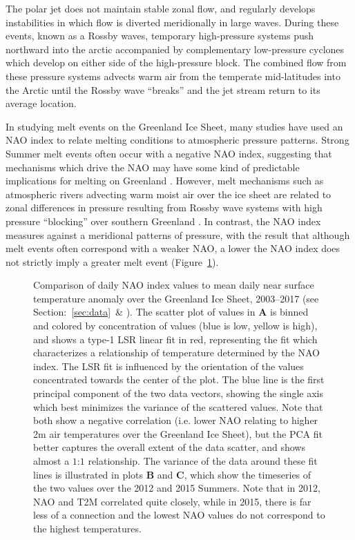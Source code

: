 \documentclass[11pt]{report}
\begin{document}
The polar jet does not maintain stable zonal flow, and regularly develops instabilities in which flow is diverted meridionally in large waves. During these events, known as a Rossby waves, temporary high-pressure systems push northward into the arctic accompanied by complementary low-pressure cyclones which develop on either side of the high-pressure block. The combined flow from these pressure systems advects warm air from the temperate mid-latitudes into the Arctic until the Rossby wave ``breaks'' and the jet stream return to its average location.


In studying melt events on the Greenland Ice Sheet, many studies have used an NAO index to relate melting conditions to atmospheric pressure patterns. Strong Summer melt events often occur with a negative NAO index, suggesting that mechanisms which drive the NAO may have some kind of predictable implications for melting on Greenland \cite[][]{hanna2013,mattingly2018,mcmillan2016,bevis2019,getraerFall,hahn2018}. However, melt mechanisms such as atmospheric rivers advecting warm moist air over the ice sheet are related to zonal differences in pressure resulting from Rossby wave systems with high pressure ``blocking'' over southern Greenland \cite[][]{mattingly2018}. In contrast, the NAO index measures against a meridional patterns of pressure, with the result that although melt events often correspond with a weaker NAO, a lower the NAO index does not strictly imply a greater melt event (Figure~\ref{fig:naovt}).

\begin{figure}[h]
\centering
{}
\caption[NAO vs. Near surface air temperature: 2003--2017]{Comparison of daily NAO index values to mean daily near surface temperature anomaly over the Greenland Ice Sheet, 2003--2017 (see Section:~\ref{sec:data}~\& ). The scatter plot of values in \textbf{A} is binned and colored by concentration of values (blue is low, yellow is high), and shows a type-1 LSR linear fit in red, representing the fit which characterizes a relationship of temperature determined by the NAO index. The LSR fit is influenced by the orientation of the values concentrated towards the center of the plot. The blue line is the first principal component of the two data vectors, showing the single axis which best minimizes the variance of the scattered values. Note that both show a negative correlation (i.e. lower NAO relating to higher 2m air temperatures over the Greenland Ice Sheet), but the PCA fit better captures the overall extent of the data scatter, and shows almost a $1$:$1$ relationship. The variance of the data around these fit lines is illustrated in plots \textbf{B} and \textbf{C}, which show the timeseries of the two values over the 2012 and 2015 Summers. Note that in 2012, NAO and T2M correlated quite closely, while in 2015, there is far less of a connection and the lowest NAO values do not correspond to the highest temperatures.} \label{fig:naovt}
\end{figure}
\end{document}
